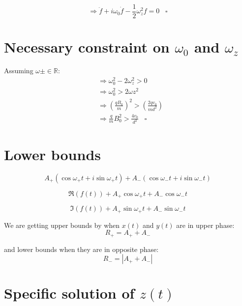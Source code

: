 \documentclass[english,notitlepage,reprint,nofootinbib]{revtex4-1}  %
\begin{document}
\begin{equation*}
    \Rightarrow \ddot{f} + i \omega_0 \dot{f} - \frac{1}{2} \omega_z^2 f = 0 \;\;\; \square
\end{equation*}


\section{Necessary constraint on $\omega_0$ and $\omega_z$}

Assuming $\omega \pm \in \mathbb{R}$:
\begin{align*}
    &\Rightarrow \omega_0^2 - 2 \omega_z^2 > 0\\
    &\Rightarrow \omega_0^2 > 2 \omega z^2\\
    &\Rightarrow \left( \frac{q B_0}{m} \right) ^2 > \left( \frac{2 q v_0}{m d^2} \right)\\
    &\Rightarrow \frac{q}{m} B_0^2 > \frac{4 v_0}{d^2} \;\;\; \square
\end{align*}



\section{Lower bounds}

\begin{equation*}
    A_+ (\cos \omega_+ t + i \sin \omega_+ t) + A_- (\cos \omega_- t + i \sin \omega_- t)
\end{equation*}

\begin{equation*}
    \Re \left( f(t) \right) + A_+ \cos \omega_+ t + A_- \cos \omega_- t
\end{equation*}

\begin{equation*}
    \Im \left( f(t) \right) + A_+ \sin \omega_+ t + A_- \sin \omega_- t
\end{equation*}

We are getting upper bounds by when $x(t)$ and $y(t)$ are in upper phase:
\begin{equation*}
    R_+ = A_+ + A_-
\end{equation*}

and lower bounds when they are in opposite phase:
\begin{equation*}
    R_- = | A_+ + A_- |
\end{equation*}


\section{Specific solution of $z(t)$}
\end{document}
